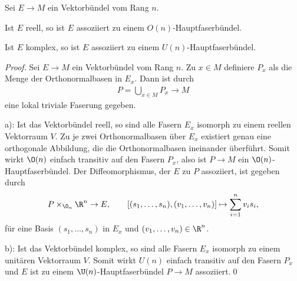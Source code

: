 \documentclass[%
	paper=a5,%
	fleqn,%
	DIV=18,%
	BCOR=0mm,
	fontsize=11pt,
	titlepage=false,%
	bibliography=totoc,
	DIV=18,%
	twoside=true,
	pdftitle=Riemannsche Geometrie,
	pdfauthor=Uwe Semmelmann,
	numbers=noendperiod]%
	{scrbook}
\begin{document}
\begin{prop}
Sei $E\to M$ ein Vektorbündel vom Rang $n$.
\begin{propenum}
\item Ist $E$ reell, so ist $E$ assoziiert zu einem
$O(n)$-Hauptfaserbündel.
\item Ist $E$ komplex, so ist $E$ assoziiert zu einem
$U(n)$-Hauptfaserbündel.\fish
\end{propenum}
\end{prop}
\begin{proof}
Sei $E\to M$ ein Vektorbündel vom Rang $n$. Zu $x\in M$ definiere $P_x$ als die
Menge der Orthonormalbasen in $E_x$. Dann ist durch
\begin{align*}
P = \bigcup_{x\in M} P_x\to M
\end{align*}
eine lokal triviale Faserung gegeben.

a): Ist das Vektorbündel reell, so sind alle Fasern $E_x$ isomorph zu einem
reellen Vektorraum $V$. Zu je zwei Orthonormalbasen über $E_x$ existiert genau
eine orthogonale Abbildung, die die Orthonormalbasen ineinander überführt. Somit
wirkt $\O(n)$ einfach transitiv auf den Fasern $P_x$, also ist $P\to M$ ein
$\O(n)$-Hauptfaserbündel. Der Diffeomorphismus, der $E$ zu $P$ assoziiert, ist
gegeben durch
\begin{align*}
P\times_{\O_n} \R^n\to E,\qquad
[(s_1,\ldots,s_n),(v_1,\ldots,v_n)]\mapsto \sum_{i=1}^n v_i s_i,
\end{align*}
für eine Basis $(s_1,\ldots,s_n)$ in $E_x$ und $(v_1,\ldots,v_n)\in\R^n$.

b): Ist das Vektorbündel komplex, so sind alle Fasern $E_x$ isomorph zu einem
unitären Vektorraum $V$. Somit wirkt $U(n)$ einfach transitiv auf den Fasern
$P_x$ und $E$ ist zu einem $\U(n)$-Hauptfaserbündel $P\to M$ assoziiert.\qed
\end{proof}
\end{document}
